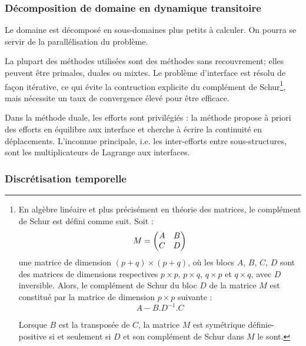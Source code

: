 \medskip
\subsubsection{Décomposition de domaine en dynamique transitoire}\label{Sec-Schur}

Le domaine est décomposé en sous-domaines plus petits à calculer.
On pourra se servir de la parallélisation du problème.

La plupart des méthodes utilisées sont des méthodes sans recouvrement; elles
peuvent être primales, duales ou mixtes. Le problème d'interface est résolu
de façon itérative, ce qui évite la contruction explicite du complément
de Schur\footnote{%
En algèbre linéaire et plus précisément en théorie des matrices, le complément de 
Schur est défini comme suit. Soit :
\begin{equation}    M=\left( \begin{matrix} A & B \\ C & D \end{matrix}\right) \end{equation}
une matrice de dimension $(p+q)\times(p+q)$, où les blocs $A$, $B$, $C$, $D$ sont des matrices 
de dimensions respectives $p\times p$, $p\times q$, $q\times p$ et $q\times q$, avec $D$ inversible. 
Alors, le complément de Schur du bloc $D$ de la matrice $M$ est constitué par la matrice 
de dimension $p\times p$ suivante :
\begin{equation} A - B.D^{-1}.C\end{equation}

Lorsque $B$ est la transposée de $C$, la matrice $M$ est symétrique définie-positive
si et seulement si $D$ et son complément de Schur dans $M$ le sont.
}, mais nécessite un taux de convergence élevé pour être
efficace.

Dans la méthode duale, les efforts sont privilégiés : la méthode propose
à priori des efforts en équilibre aux interface et cherche à écrire la continuité
en déplacements. L'inconnue principale, i.e. les inter-efforts entre sous-structures,
sont les multiplicateurs de Lagrange aux interfaces.

\medskip
\subsubsection{Discrétisation temporelle}

